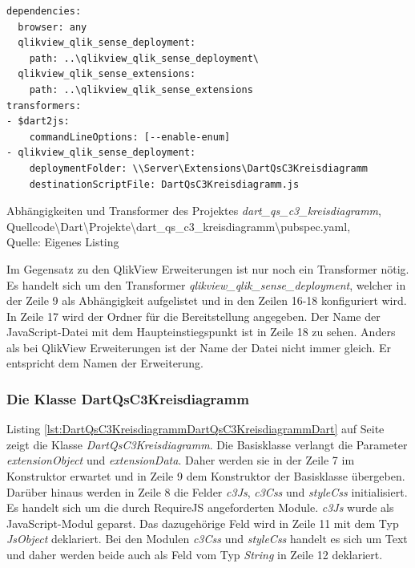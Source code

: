 \ifIncludeFigures\begin{listing}[htbp]
\begin{verbatim}
dependencies:
  browser: any
  qlikview_qlik_sense_deployment:
    path: ..\qlikview_qlik_sense_deployment\
  qlikview_qlik_sense_extensions:
    path: ..\qlikview_qlik_sense_extensions
transformers:
- $dart2js:
    commandLineOptions: [--enable-enum]
- qlikview_qlik_sense_deployment:
    deploymentFolder: \\Server\Extensions\DartQsC3Kreisdiagramm
    destinationScriptFile: DartQsC3Kreisdiagramm.js
\end{verbatim}
\caption[Abhängigkeiten und Transformer des Projektes \textit{dart\_qs\_c3\_kreisdiagramm}]{Abhängigkeiten und Transformer des Projektes \textit{dart\_qs\_c3\_kreisdiagramm}, \\Quellcode\textbackslash{}Dart\textbackslash{}Projekte\textbackslash{}dart\_qs\_c3\_kreisdiagramm\textbackslash{}pubspec.yaml, \\Quelle: Eigenes Listing}
\label{lst:DartQsC3KreisdiagrammPubspecYaml}
\end{listing}\fi

Im Gegensatz zu den QlikView Erweiterungen ist nur noch ein Transformer nötig. Es handelt sich um den Transformer \textit{qlikview\_qlik\_sense\_deployment}, welcher in der Zeile 9 als Abhängig\-keit aufgelistet und in den Zeilen 16-18 konfiguriert wird. In Zeile 17 wird der Ordner für die Bereitstellung angegeben. Der Name der JavaScript-Datei mit dem Haupteinstiegspunkt ist in Zeile 18 zu sehen. Anders als bei QlikView Erweiterungen ist der Name der Datei nicht immer gleich. Er entspricht dem Namen der Erweiterung. 

\subsubsection{Die Klasse DartQsC3Kreisdiagramm}

Listing \ref{lst:DartQsC3KreisdiagrammDartQsC3KreisdiagrammDart} auf Seite \pageref{lst:DartQsC3KreisdiagrammDartQsC3KreisdiagrammDart} zeigt die Klasse \textit{DartQsC3Kreisdiagramm}. Die Basisklasse verlangt die Parameter \textit{extensionObject} und \textit{extensionData}. Daher werden sie in der Zeile 7 im Konstruktor erwartet und in Zeile 9 dem Konstruktor der Basisklasse übergeben. Darüber hinaus werden in Zeile 8 die Felder \textit{c3Js}, \textit{c3Css} und \textit{styleCss} initialisiert. Es handelt sich um die durch RequireJS angeforderten Module. \textit{c3Js} wurde als JavaScript-Modul geparst. Das dazugehörige Feld wird in Zeile 11 mit dem Typ \textit{JsObject} deklariert. Bei den Modulen \textit{c3Css} und \textit{styleCss} handelt es sich um Text und daher werden beide auch als Feld vom Typ \textit{String} in Zeile 12 deklariert.



